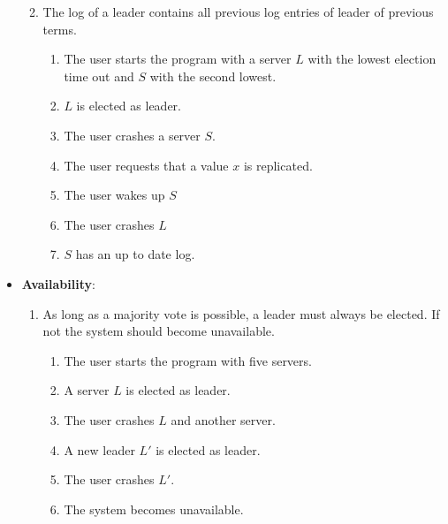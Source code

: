 \begin{itemize}
\begin{enumerate}
\begin{enumerate}
        \end{enumerate}
    \item The log of a leader contains all previous log entries of leader of previous terms.
        \begin{enumerate}
        \item The user starts the program with a server $L$ with the lowest election time out and $S$ with the second lowest.
        \item $L$ is elected as leader.
        \item The user crashes a server $S$.
        \item The user requests that a value $x$ is replicated.
        \item The user wakes up $S$
        \item The user crashes $L$
        \item $S$ has an up to date log.
        \end{enumerate}
    \end{enumerate}

\pagebreak
\item \textbf{Availability}:
    \begin{enumerate}
    \item As long as a majority vote is possible, a leader must always be elected. If not the system should become unavailable.
        \begin{enumerate}
        \item The user starts the program with five servers.
        \item A server $L$ is elected as leader.
        \item The user crashes $L$ and another server.
        \item A new leader $L'$ is elected as leader.
        \item The user crashes $L'$.
        \item The system becomes unavailable.
        \end{enumerate}
    \end{enumerate}
\end{itemize}
